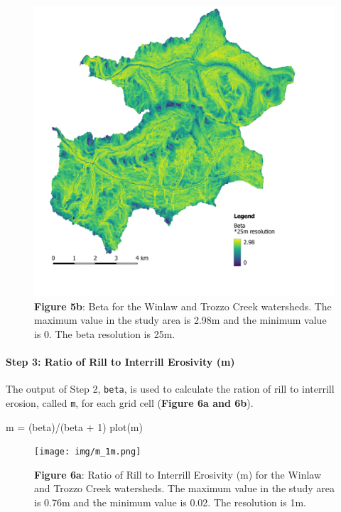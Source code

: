 \documentclass[
]{article}
\newenvironment{Shaded}{\begin{snugshade}}{\end{snugshade}}
\newcommand{\DecValTok}[1]{\textcolor[rgb]{0.00,0.00,0.81}{#1}}
\newcommand{\FunctionTok}[1]{\textcolor[rgb]{0.00,0.00,0.00}{#1}}
\newcommand{\NormalTok}[1]{#1}
\newcommand{\OtherTok}[1]{\textcolor[rgb]{0.56,0.35,0.01}{#1}}
\newcommand{\SpecialCharTok}[1]{\textcolor[rgb]{0.00,0.00,0.00}{#1}}
\begin{document}
\begin{figure}
\centering
\includegraphics{img/beta_25m.png}
\caption{\textbf{Figure 5b}: Beta for the Winlaw and Trozzo Creek watersheds. The maximum value in the study area is 2.98m and the minimum value is 0. The beta resolution is 25m.}
\end{figure}

\hypertarget{sec-step-3-ls}{%
\paragraph*{Step 3: Ratio of Rill to Interrill Erosivity (m)}\label{sec-step-3-ls}}

The output of Step 2, \texttt{beta}, is used to calculate the ration of rill to interrill erosion, called \texttt{m}, for each grid cell (\textbf{Figure 6a and 6b}).

\begin{Shaded}
\begin{Highlighting}[]
\NormalTok{m }\OtherTok{=}\NormalTok{ (beta)}\SpecialCharTok{/}\NormalTok{(beta }\SpecialCharTok{+} \DecValTok{1}\NormalTok{) }\FunctionTok{plot}\NormalTok{(m)}
\end{Highlighting}
\end{Shaded}

\begin{figure}
\centering
\texttt{[image: img/m\_1m.png]}
\caption{\textbf{Figure 6a}: Ratio of Rill to Interrill Erosivity (m) for the Winlaw and Trozzo Creek watersheds. The maximum value in the study area is 0.76m and the minimum value is 0.02. The resolution is 1m.}
\end{figure}
\end{document}
